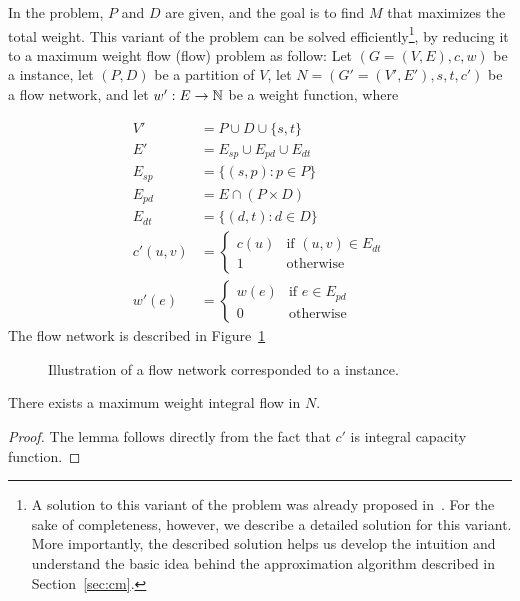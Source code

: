\label{sec:fixed}
In the \textsc{\FIXEDCARPOOL{}} problem, $P$ and $D$ are given, 
and the goal is to find $M$ that maximizes the total weight. 
This variant of the problem can be solved efficiently\footnote{
A solution to this variant of the problem was already proposed in~\cite{hartman2014theory}.
For the sake of completeness, however, we describe a detailed solution for this variant. 
More importantly, 
the described solution helps us develop the intuition and understand the basic idea behind the
approximation algorithm described in Section~\ref{sec:cm}.   
},
by reducing it to a maximum weight flow (flow) problem as
follow:
Let $(G = (V, E), c, w)$ be a \CARPOOL{} instance,
let $(P, D)$ be a partition of $V$,
let  $N = (G' = (V', E'), s, t, c')$ be a flow network, 
and let $w' : E \rightarrow \mathbb{N}$ be a weight function, where 

\begin{align*}
V'			& = P \cup D \cup \{s, t\}										\\
E'			& = E_{sp} \cup E_{pd} \cup E_{dt}								\\
E_{sp}		& =	\{(s, p) : p \in P \}										\\
E_{pd}		& =	E \cap (P \times D)											\\
E_{dt}		& =	\{(d, t) : d \in D \}										\\
c'(u, v)	& = 
				\begin{cases}
				c(u) & \text{if } (u, v) \in E_{dt} 						\\
				1 & \text{otherwise}
				\end{cases}
																			\\
w'(e)			& = 
				\begin{cases}
				w(e) & \text{if } e \in E_{pd} 								\\
				0 & \text{otherwise}	
				\end{cases}
\end{align*}
The flow network is described in Figure~\ref{fig:flow}
\begin{figure}
\centering

\caption{
\label{fig:flow}
Illustration of a flow network corresponded to a \FIXEDCARPOOL{} instance.}
\end{figure}

\begin{lemma}
There exists a maximum weight integral flow in $N$.
\end{lemma}

\begin{proof}
The lemma follows directly from the fact that $c'$ is integral capacity function.
\end{proof}

